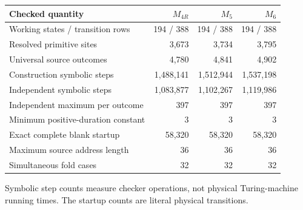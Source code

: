 \begin{center}\small
\begin{tabular}{@{}lrrr@{}}
\toprule
Checked quantity & $M_{4R}$ & $M_5$ & $M_6$ \\\midrule
Working states / transition rows & 194 / 388 & 194 / 388 & 194 / 388\\
Resolved primitive sites & 3,673 & 3,734 & 3,795\\
Universal source outcomes & 4,780 & 4,841 & 4,902\\
Construction symbolic steps & 1,488,141 & 1,512,944 & 1,537,198\\
Independent symbolic steps & 1,083,877 & 1,102,267 & 1,119,986\\
Independent maximum per outcome & 397 & 397 & 397\\
Minimum positive-duration constant & 3 & 3 & 3\\
Exact complete blank startup & 58,320 & 58,320 & 58,320\\
Maximum source address length & 36 & 36 & 36\\
Simultaneous fold cases & 32 & 32 & 32\\
\bottomrule\end{tabular}
\end{center}
Symbolic step counts measure checker operations, not physical Turing-machine running times. The startup counts are literal physical transitions.
